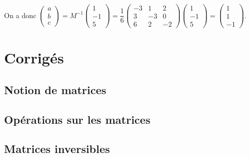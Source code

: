 \documentclass[11pt,fleqn]{book} %
\begin{document}
\begin{solution}
On a donc $\begin{pmatrix}a\\b\\c\end{pmatrix} = M^{-1}\begin{pmatrix}1\\-1\\5\end{pmatrix} = \dfrac{1}{6}\begin{pmatrix}-3&1&2\\ 3&-3&0\\ 6&2&-2\end{pmatrix}\begin{pmatrix}1\\-1\\5\end{pmatrix}=\begin{pmatrix}1\\1\\-1\end{pmatrix}$.
\end{solution}


\chapter{Corrigés}

\section*{Notion de matrices}

\printsolutions[collection={mat01}, headings={false} ]

\section*{Opérations sur les matrices}

\printsolutions[collection={mat02}, headings={false} ]

\section*{Matrices inversibles}

\printsolutions[collection={mat03}, headings={false} ]
\end{document}
